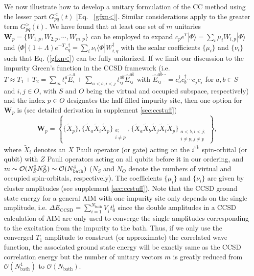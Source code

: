 \documentclass[aip,reprint,table,xcdraw,usenames,dvipsnames]{revtex4-1}
\begin{document}
We now illustrate how to develop a unitary formulation of the CC method using the lesser  part $G^{<}_{pq}(t)$ [Eq. ~\eqref{gfxn<}]. Similar considerations apply to the greater term $G^{>}_{pq}(t)$. We have found that at least one set of $m$ unitaries $\mathbf{W}_p = \{ W_{1,p}, W_{2,p}, \cdots, W_{m,p} \}$ can be employed to expand 
$c_p e^{T} | \Phi \rangle = \sum_i \mu_i W_{i,p} | \Phi \rangle$ and
$\langle \Phi |(1+\Lambda) e^{-T} c_q^\dagger = \sum_i \nu_i \langle \Phi | W_{i,q}^\dagger$ 
with the scalar coefficients $\{\mu_i\}$ and $\{\nu_i\}$ such that Eq. (\ref{gfxn<}) can be fully unitarized. If we limit our discussion to the impurity Green's function in the CCSD framework (i.e. $T \approx T_1+T_2 = \sum_{ai}t_i^a \hat{E}^a_i + \sum_{a<b,i<j} t_{ij}^{ab} \hat{E}^{ab}_{ij}$ with $\hat{E}^{ab\cdots}_{ij\cdots} = c_a^\dagger c_b^\dagger \cdots c^{\phantom\dagger}_j c^{\phantom\dagger}_i$ for $a,b\in S$ and $i,j\in O$, with $S$ and $O$ being 
the virtual and occupied subspace, respectively) and the index $p\in O$ designates the half-filled impurity site, then one option for $\textbf{W}_p$ is (see detailed derivation in supplement \ref{sec:ccstuff})
%
\begin{equation*}
\mathbf{W}_p =\left\{ 
\{\tilde{X}_p\}, 
\{ \tilde{X}_a \tilde{X}_i \tilde{X}_p\}_{\substack{a; \\ i\neq p}},
\{\tilde{X}_a \tilde{X}_b \tilde{X}_j \tilde{X}_i \tilde{X}_p\}
_{\substack{a<b,i<j; \\ i\neq p, j\neq p}} 
\right\}, 
\end{equation*}
%
where $\tilde{X}_i$ denotes an $X$ Pauli operator (or gate) acting on the $i$\textsuperscript{th} spin-orbital (or qubit) with $Z$ Pauli operators acting on all qubits before it in our ordering, and $m \sim \mathcal{O}(N_S^2N_O^2) \sim \mathcal{O}(N_{\rm bath}^4)$ ($N_S$ and $N_O$ denote the numbers of virtual and occupied spin-orbitals, respectively).
%
The coefficients $\{\mu_i\}$ and $\{\nu_i\}$ are given by cluster amplitudes (see supplement \ref{sec:ccstuff}). Note that the CCSD ground state energy for a general AIM with one impurity site only depends on the single amplitude, i.e. $\Delta E_{\text{CCSD}}=\sum_{i=1}^{N_{\text{bath}}}V^{\phantom\dagger}_i t_0^i$ since the double amplitudes in a CCSD calculation of AIM are only used to converge the single amplitudes corresponding to the excitation from the impurity to the bath. Thus, if we only use the converged $T_1$ amplitude to construct (or approximate) the correlated wave function, the associated ground state energy will be exactly same as the CCSD correlation energy but the number of unitary vectors $m$ is greatly reduced from $\mathcal{O}(N_{\text{bath}}^4)$ to $\mathcal{O}(N_{\text{bath}})$. 
\end{document}
